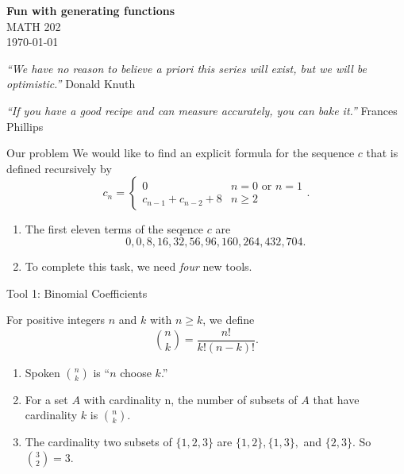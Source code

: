 \documentclass[portrait,fleqn,12pt]{beamer}
\newenvironment{handlist}
   {\begin{enumerate}[\faHandPointRight]
       \addtolength{\itemsep}{0.0\itemsep}}
     {\end{enumerate}}
\begin{document}
\begin{frame}
\begin{flushleft} 
\textbf{Fun with generating functions} \\
MATH 202 \\
\today 
\end{flushleft}


\emph{“We have no reason to believe a priori this series will exist, but we will be optimistic.”} \hfill{\sc Donald Knuth}

\emph{“If you have a good recipe and can measure accurately, you can bake it.”} \hfill{\sc Frances Phillips}
\end{frame}


\begin{frame}[fragile]{Our problem}
We would like to find an explicit formula for the sequence $c$ that is defined recursively by
\begin{equation}
  c_n= \begin{cases} 0 & n =0 \text{ or } n =1 \\
                                 c_{n-1} + c_{n-2}+ 8 & n \geq 2
           \end{cases}.
\end{equation}
\begin{handlist}
\item The first eleven terms of the seqence $c$ are
\begin{equation}
      0,0,8,16,32,56,96,160,264,432,704.
\end{equation}
\item To complete this task, we need \emph{four} new tools.
\end{handlist}
\end{frame}
\begin{frame}{Tool 1:  Binomial Coefficients}

For positive integers $n$ and $k$ with $n \geq k$, we define
\begin{equation}
      \binom{n}{k} = \frac{n!}{k! (n-k)!}.
\end{equation}
\begin{handlist}
 \item Spoken $\binom{n}{k}$ is ``$n$ choose $k$.''
 \item For a set $A$ with cardinality n,  the number of subsets of $A$ that have cardinality $k$ is $\binom{n}{k}$.
 \item The cardinality two subsets of $\{1,2,3\}$ are $\{1,2\},\{1,3\},$ and $\{2,3\}$.  So  $\binom{3}{2} = 3$.
\end{handlist}
\end{frame}
\end{document}
